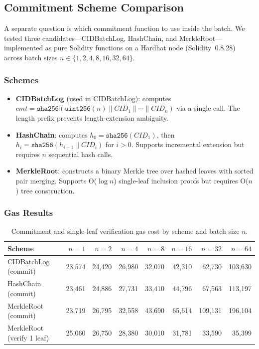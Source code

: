 \documentclass{svproc}
\def\ours{\xspace{CIDBatchLog}\xspace}
\begin{document}
\subsection{Commitment Scheme Comparison}
\label{sec:commitment-comparison}

A separate question is which commitment function to use inside the batch. We tested three candidates---CIDBatchLog, HashChain, and MerkleRoot---implemented as pure Solidity functions on a Hardhat node (Solidity~0.8.28) across batch sizes $n \in \{1, 2, 4, 8, 16, 32, 64\}$.

\subsubsection{Schemes}
\begin{itemize}
    \item \textbf{CIDBatchLog} (used in \ours): computes $cmt = \texttt{sha256}(\texttt{uint256}(n) \| CID_1 \| \cdots \| CID_n)$ via a single call. The length prefix prevents length-extension ambiguity.
    \item \textbf{HashChain}: computes $h_0 = \texttt{sha256}(CID_1)$, then $h_i = \texttt{sha256}(h_{i-1} \| CID_i)$ for $i > 0$. Supports incremental extension but requires $n$ sequential hash calls.
    \item \textbf{MerkleRoot}: constructs a binary Merkle tree over hashed leaves with sorted pair merging. Supports O($\log n$) single-leaf inclusion proofs but requires O($n$) tree construction.
\end{itemize}

\subsubsection{Gas Results}

\begin{table}[ht]
\centering
\caption{Commitment and single-leaf verification gas cost by scheme and batch size $n$.}
\label{tab:commitment-gas}
\begin{tabular}{lrrrrrrr}
\hline
\textbf{Scheme} & $n=1$ & $n=2$ & $n=4$ & $n=8$ & $n=16$ & $n=32$ & $n=64$ \\
\hline
CIDBatchLog (commit)        & 23{,}574 & 24{,}420 & 26{,}980 & 32{,}070 & 42{,}310 & 62{,}730 & 103{,}630 \\
HashChain  (commit)        & 23{,}461 & 24{,}886 & 27{,}731 & 33{,}410 & 44{,}796 & 67{,}563 & 113{,}197 \\
MerkleRoot (commit)        & 23{,}719 & 26{,}795 & 32{,}558 & 43{,}690 & 65{,}614 & 109{,}131 & 196{,}104 \\
\hline
MerkleRoot (verify 1 leaf) & 25{,}060 & 26{,}750 & 28{,}380 & 30{,}010 & 31{,}781 & 33{,}590 & 35{,}399 \\
\hline
\end{tabular}
\end{table}
\end{document}
